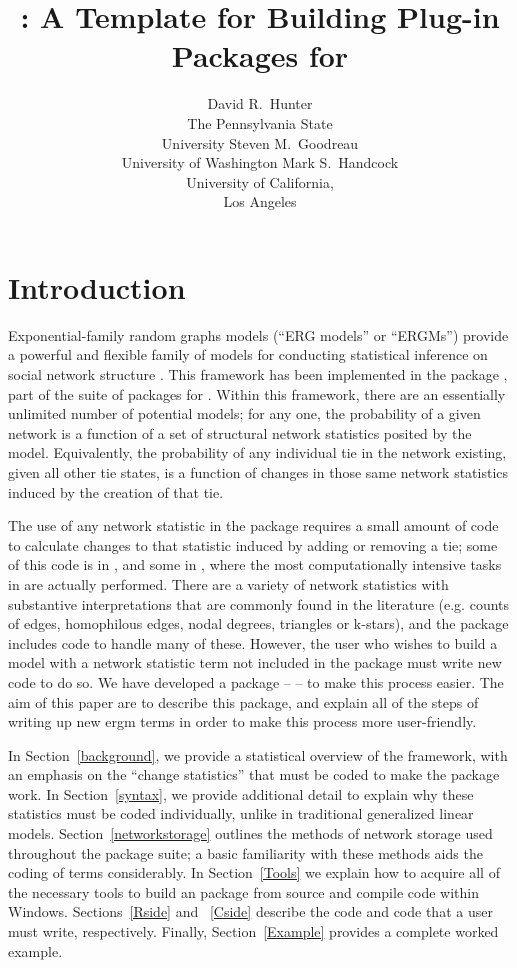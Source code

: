 \documentclass[nojss]{jss}
\title{\pkg{ergm.userterms}: A Template for Building Plug-in Packages for
\pkg{statnet}}
\author{
  David R.\ Hunter \\ The Pennsylvania State\\University \And
  Steven M.\ Goodreau \\ University of Washington \And
  Mark S.\ Handcock \\ University of California,\\Los Angeles
}
\begin{document}
\section{Introduction}
\label{introduction}

Exponential-family random graphs models (``ERG models'' or ``ERGMs'') provide a powerful and flexible family of models for conducting statistical inference on social network structure
\citep{fra86, statnetjss,ergmjss, statnettutorialjss}.
This framework has been implemented in the  package
\citep{ergmjss}, part of the  suite of packages \citep{statnetjss}
for  \citep{r2010}. Within this framework, there are an essentially unlimited number of potential models; for any one, the probability of a given network is a function of a set of structural network statistics posited by the model. Equivalently, the probability of any individual tie in the network existing, given all other tie states, is a function of changes in those same network statistics induced by the creation of that tie.

The use of any network statistic in the  package requires a small amount of code to calculate changes to that statistic induced by adding or removing a tie; some of this code is in , and some in , where the most computationally intensive tasks in  are actually performed. There are a variety of network statistics with substantive interpretations that are commonly found in the literature (e.g. counts of edges, homophilous edges, nodal degrees, triangles or k-stars), and the  package includes code to handle many of these.  However, the user who wishes to build a model with a network statistic term not included in the  package must write new code to do so.  We have developed a package --  -- to make this process easier.  The aim of this paper are to describe this package, and explain all of the steps of writing up new ergm terms in order to make this process more user-friendly.

In Section~\ref{background}, we provide a statistical overview of the  framework, with an emphasis on the ``change statistics'' that must be coded to make the  package work.  In Section~\ref{syntax}, we provide additional detail to explain why these statistics must be coded individually, unlike in traditional generalized linear models. Section~\ref{networkstorage} outlines the methods of network storage used throughout the  package suite; a basic familiarity with these methods aids the coding of  terms considerably. In Section~\ref{Tools} we explain how to acquire all of the necessary tools to build an  package from source and compile  code within Windows. Sections~\ref{Rside} and ~\ref{Cside} describe the  code and  code that a user must write, respectively. Finally, Section~\ref{Example} provides a complete worked example.
\end{document}
